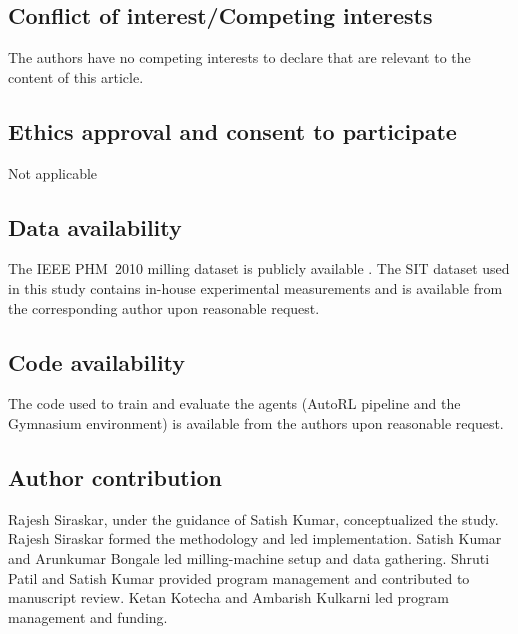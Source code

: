 \documentclass[sn-basic]{sn-jnl}%
\begin{document}
\subsection*{Conflict of interest/Competing interests}
The authors have no competing interests to declare that are relevant to the content of this article.

\subsection*{Ethics approval and consent to participate}
Not applicable

\subsection*{Data availability}
The IEEE PHM~2010 milling dataset is publicly available \cite{PHMdata2010}. The SIT dataset used in this study contains in-house experimental measurements and is available from the corresponding author upon reasonable request.

\subsection*{Code availability}
The code used to train and evaluate the agents (AutoRL pipeline and the Gymnasium environment) is available from the authors upon reasonable request.

\subsection*{Author contribution}
Rajesh Siraskar, under the guidance of Satish Kumar, conceptualized the study. Rajesh Siraskar formed the methodology and led implementation. Satish Kumar and Arunkumar Bongale led milling-machine setup and data gathering. Shruti Patil and Satish Kumar provided program management and contributed to manuscript review. Ketan Kotecha and Ambarish Kulkarni led program management and funding.
\end{document}
